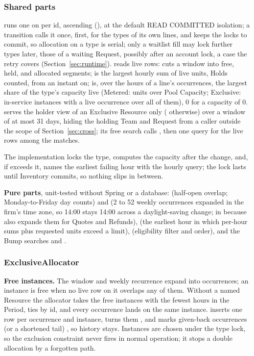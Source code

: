 \subsubsection*{Shared parts}
{\sloppy{} runs one  on  per id, ascending (), at the default READ COMMITTED isolation; a transition calls it once, first, for the types of its own lines, and keeps the locks to commit, so allocation on a type is serial; only a waitlist fill may lock further types later, those of a waiting Request, possibly after an account lock, a case the retry covers (Section~\ref{sec:runtime}).  reads live rows:  cuts a window into free, held, and allocated segments;  is the largest hourly sum of live units, Holds counted, from an instant on;  is, over the hours of a line's occurrences, the largest share of the type's capacity live (Metered: units over Pool Capacity; Exclusive: in-service instances with a live occurrence over all of them), 0 for a capacity of 0.  serves the holder view of an Exclusive Resource only ( otherwise) over a window of at most 31 days, hiding the holding Team and Request from a caller outside the scope of Section~\ref{sec:cross}; its free search calls , then one query for the live rows among the matches.\par} The  implementation locks the type, computes the capacity after the change, and, if  exceeds it, names the earliest failing hour with the hourly query; the lock lasts until Inventory commits, so nothing slips in between.

\textbf{Pure parts}, unit-tested without Spring or a database:  (half-open overlap; Monday-to-Friday day counts) and  (2 to 52 weekly occurrences expanded in the firm's time zone, so 14:00 stays 14:00 across a daylight-saving change; in  because  also expands them for Quotes and Refunds),  (the earliest hour in which per-hour sums plus requested units exceed a limit),  (eligibility filter and order), and the Bump searches  and .

\subsubsection*{ExclusiveAllocator}
\textbf{Free instances.} The window and weekly recurrence expand into occurrences; an instance is free when no live row on it overlaps any of them. Without a named Resource the allocator takes the free instances with the fewest  hours in the Period, ties by id, and every occurrence lands on the same instance.  inserts one  row per occurrence and instance,  turns them , and  marks given-back occurrences (or a shortened tail) , so history stays. Instances are chosen under the type lock, so the exclusion constraint never fires in normal operation; it stops a double allocation by a forgotten path.

